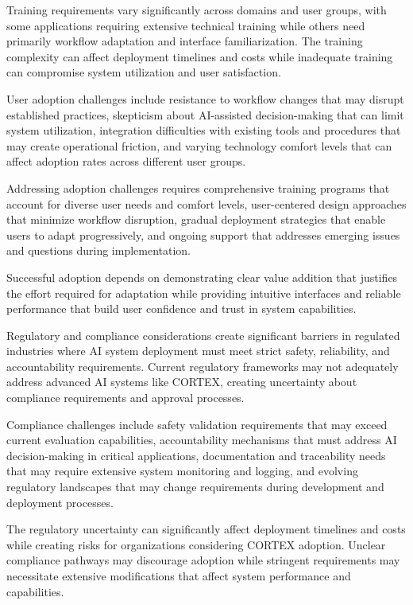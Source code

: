 Training requirements vary significantly across domains and user groups, with some applications requiring extensive technical training while others need primarily workflow adaptation and interface familiarization. The training complexity can affect deployment timelines and costs while inadequate training can compromise system utilization and user satisfaction.

User adoption challenges include resistance to workflow changes that may disrupt established practices, skepticism about AI-assisted decision-making that can limit system utilization, integration difficulties with existing tools and procedures that may create operational friction, and varying technology comfort levels that can affect adoption rates across different user groups.

Addressing adoption challenges requires comprehensive training programs that account for diverse user needs and comfort levels, user-centered design approaches that minimize workflow disruption, gradual deployment strategies that enable users to adapt progressively, and ongoing support that addresses emerging issues and questions during implementation.

Successful adoption depends on demonstrating clear value addition that justifies the effort required for adaptation while providing intuitive interfaces and reliable performance that build user confidence and trust in system capabilities.

Regulatory and compliance considerations create significant barriers in regulated industries where AI system deployment must meet strict safety, reliability, and accountability requirements. Current regulatory frameworks may not adequately address advanced AI systems like CORTEX, creating uncertainty about compliance requirements and approval processes.

Compliance challenges include safety validation requirements that may exceed current evaluation capabilities, accountability mechanisms that must address AI decision-making in critical applications, documentation and traceability needs that may require extensive system monitoring and logging, and evolving regulatory landscapes that may change requirements during development and deployment processes.

The regulatory uncertainty can significantly affect deployment timelines and costs while creating risks for organizations considering CORTEX adoption. Unclear compliance pathways may discourage adoption while stringent requirements may necessitate extensive modifications that affect system performance and capabilities.

